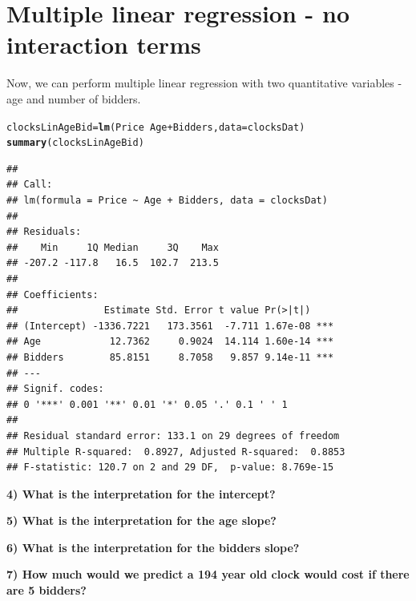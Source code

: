 \documentclass{article}\usepackage[]{graphicx}\usepackage[]{color}
\makeatletter
\newcommand{\hlopt}[1]{\textcolor[rgb]{0,0,0}{#1}}%
\newcommand{\hlstd}[1]{\textcolor[rgb]{0.345,0.345,0.345}{#1}}%
\newcommand{\hlkwb}[1]{\textcolor[rgb]{0.69,0.353,0.396}{#1}}%
\newcommand{\hlkwc}[1]{\textcolor[rgb]{0.333,0.667,0.333}{#1}}%
\newcommand{\hlkwd}[1]{\textcolor[rgb]{0.737,0.353,0.396}{\textbf{#1}}}%
\newenvironment{kframe}{%
 \def\at@end@of@kframe{}%
 \ifinner\ifhmode%
  \def\at@end@of@kframe{\end{minipage}}%
  \begin{minipage}{\columnwidth}%
 \fi\fi%
 \def\FrameCommand##1{\hskip\@totalleftmargin \hskip-\fboxsep
 \colorbox{shadecolor}{##1}\hskip-\fboxsep
     \hskip-\linewidth \hskip-\@totalleftmargin \hskip\columnwidth}%
 \MakeFramed {\advance\hsize-\width
   \@totalleftmargin\z@ \linewidth\hsize
   \@setminipage}}%
 {\par\unskip\endMakeFramed%
 \at@end@of@kframe}
\newenvironment{knitrout}{}{} %
\makeatother
\begin{document}
\newpage

\section{Multiple linear regression - no interaction terms}

Now, we can perform multiple linear regression with two quantitative variables - age and number of bidders.

\begin{knitrout}
\color{fgcolor}\begin{kframe}
\begin{alltt}
\hlstd{clocksLinAgeBid} \hlkwb{=} \hlkwd{lm}\hlstd{(Price} \hlopt{~} \hlstd{Age} \hlopt{+} \hlstd{Bidders,} \hlkwc{data}\hlstd{=clocksDat)}
\hlkwd{summary}\hlstd{(clocksLinAgeBid)}
\end{alltt}
\begin{verbatim}
## 
## Call:
## lm(formula = Price ~ Age + Bidders, data = clocksDat)
## 
## Residuals:
##    Min     1Q Median     3Q    Max 
## -207.2 -117.8   16.5  102.7  213.5 
## 
## Coefficients:
##               Estimate Std. Error t value Pr(>|t|)    
## (Intercept) -1336.7221   173.3561  -7.711 1.67e-08 ***
## Age            12.7362     0.9024  14.114 1.60e-14 ***
## Bidders        85.8151     8.7058   9.857 9.14e-11 ***
## ---
## Signif. codes:  
## 0 '***' 0.001 '**' 0.01 '*' 0.05 '.' 0.1 ' ' 1
## 
## Residual standard error: 133.1 on 29 degrees of freedom
## Multiple R-squared:  0.8927,	Adjusted R-squared:  0.8853 
## F-statistic: 120.7 on 2 and 29 DF,  p-value: 8.769e-15
\end{verbatim}
\end{kframe}
\end{knitrout}

\vspace{5mm}

\textbf{4) What is the interpretation for the intercept?}

\vspace{20mm}

\textbf{5) What is the interpretation for the age slope?}

\vspace{20mm}

\textbf{6) What is the interpretation for the bidders slope?}

\vspace{20mm}

\textbf{7) How much would we predict a 194 year old clock would cost if there are 5 bidders?}
\end{document}
